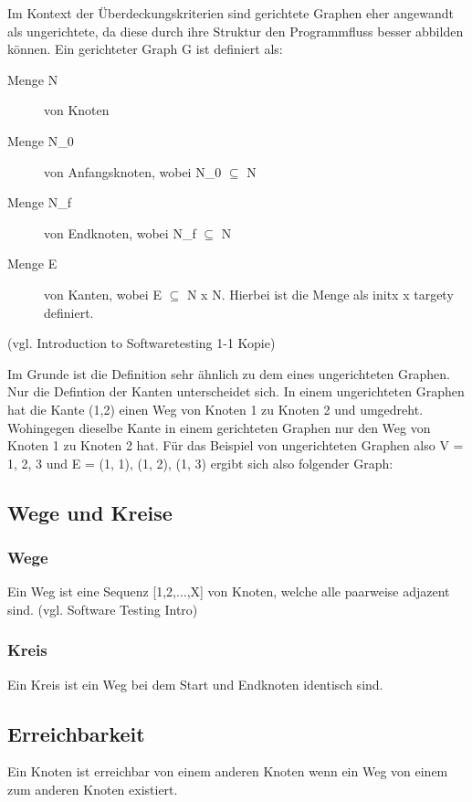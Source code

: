 Im Kontext der Überdeckungskriterien sind gerichtete Graphen eher angewandt als ungerichtete, da diese durch ihre
Struktur den Programmfluss besser abbilden können.
Ein gerichteter Graph G ist definiert als:

\begin{description}
    \item[Menge N] von Knoten
    \item[Menge N_{0}] von Anfangsknoten, wobei N_{0} $\subseteq$ N
    \item[Menge N_{f}] von Endknoten, wobei N_{f} $\subseteq$ N
    \item[Menge E] von Kanten, wobei E $\subseteq$ N x N. Hierbei ist die Menge als init{x} x target{y} definiert.
\end{description} (vgl. Introduction to Softwaretesting 1-1 Kopie)

Im Grunde ist die Definition sehr ähnlich zu dem eines ungerichteten Graphen. Nur die Defintion der Kanten unterscheidet
sich. In einem ungerichteten Graphen hat die Kante (1,2) einen Weg von Knoten 1 zu Knoten 2 und umgedreht.
Wohingegen dieselbe Kante in einem gerichteten Graphen nur den Weg von Knoten 1 zu Knoten 2 hat.
Für das Beispiel von ungerichteten Graphen also V = {1, 2, 3} und E = {(1, 1), (1, 2), (1, 3)} ergibt sich also folgender Graph:

\begin{center}
\end{center}

\subsection{Wege und Kreise}
\subsubsection{Wege}
Ein Weg ist eine Sequenz [1,2,...,X] von Knoten, welche alle paarweise adjazent sind. (vgl. Software Testing Intro)

\subsubsection{Kreis}
Ein Kreis ist ein Weg bei dem Start und Endknoten identisch sind.

\subsection{Erreichbarkeit}
Ein Knoten ist erreichbar von einem anderen Knoten wenn ein Weg von einem zum anderen Knoten existiert.


